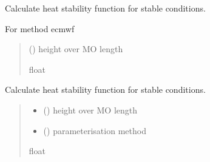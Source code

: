 \documentclass[letterpaper,10pt,english]{sphinxmanual}
\begin{document}
\begin{fulllineitems}
\label{\detokenize{users_guide:AirSeaFluxCode.flux_subs.stratification.psi_ecmwf}}
\pysigstartsignatures
\pysiglinewithargsret
{}
{}
{}
\pysigstopsignatures
\sphinxAtStartPar
Calculate heat stability function for stable conditions.

\sphinxAtStartPar
For method ecmwf
\begin{quote}\begin{description}
\sphinxAtStartPar
{} () \textendash{} height over MO length

\sphinxAtStartPar
{}

\sphinxAtStartPar
float

\end{description}\end{quote}

\end{fulllineitems}


\begin{fulllineitems}
\label{\detokenize{users_guide:AirSeaFluxCode.flux_subs.stratification.psi_stab}}
\pysigstartsignatures
\pysiglinewithargsret
{}
{\sphinxparamcomma {}}
{}
\pysigstopsignatures
\sphinxAtStartPar
Calculate heat stability function for stable conditions.
\begin{quote}\begin{description}
\begin{itemize}
\item {}
\sphinxAtStartPar
{} () \textendash{} height over MO length

\item {}
\sphinxAtStartPar
{} () \textendash{} parameterisation method

\end{itemize}

\sphinxAtStartPar
{}

\sphinxAtStartPar
float

\end{description}\end{quote}

\end{fulllineitems}
\end{document}
